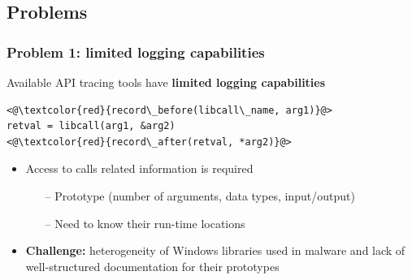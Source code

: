 \documentclass[compress]{beamer}
\begin{document}

\subsection{Problems}
\begin{frame}[fragile]
    \frametitle{Problem 1: limited logging capabilities}

Available API tracing tools have \textbf{limited logging capabilities}
\medskip
	\begin{block}{}
\begin{lstlisting}[basicstyle=\ttfamily\large,xleftmargin=50pt]
<@\textcolor{red}{record\_before(libcall\_name, arg1)}@> 
retval = libcall(arg1, &arg2)
<@\textcolor{red}{record\_after(retval, *arg2)}@> 
\end{lstlisting}
\end{block}	
\medskip
\begin{itemize}
\item Access to calls related information is required
\begin{itemize}
\item[--] Prototype (number of arguments, data types, input/output)
\item[--] Need to know their run-time locations
\end{itemize}
\medskip
\item \textbf{Challenge:} heterogeneity of Windows libraries used in malware and lack of well-structured documentation for their prototypes
\end{itemize}
	
\end{frame}
\end{document}
